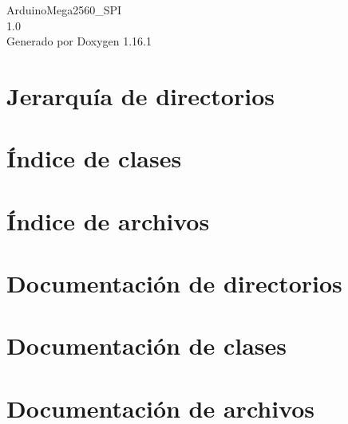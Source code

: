 \documentclass[twoside]{book}
\newcommand{\+}{\discretionary{\mbox{\scriptsize$\hookleftarrow$}}{}{}}
\newcommand{\clearemptydoublepage}{%
    \newpage{\pagestyle{empty}\cleardoublepage}%
  }
\begin{document}
  \raggedbottom
    \hypersetup{pageanchor=false,
                bookmarksnumbered=true,
                pdfencoding=unicode
               }
  \begin{titlepage}
  \vspace*{7cm}
  \begin{center}%
  {\Large Arduino\+Mega2560\+\_\+\+SPI}\\
  [1ex]\large 1.\+0 \\
  \vspace*{1cm}
  {\large Generado por Doxygen 1.16.1}\\
  \end{center}
  \end{titlepage}
  \clearemptydoublepage
  \tableofcontents
  \clearemptydoublepage
  \hypersetup{pageanchor=true}

\chapter{Jerarquía de directorios}

\chapter{Índice de clases}

\chapter{Índice de archivos}

\chapter{Documentación de directorios}


\chapter{Documentación de clases}

\chapter{Documentación de archivos}



















  \backmatter
  \newpage
  \clearemptydoublepage
  \printindex
\end{document}

